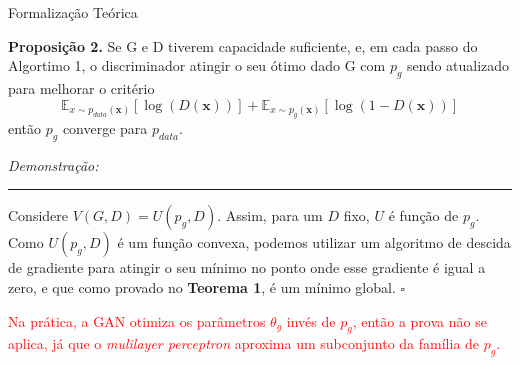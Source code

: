 \documentclass[10pt]{beamer}
\newcommand*{\QEDB}{\hfill\ensuremath{\square}}%
\begin{document}
	




\begin{frame}[fragile]{Formalização Teórica}
	
	\small
	\textbf{Proposição 2.} Se G e D tiverem capacidade suficiente,
	e, em cada passo do Algortimo 1, o discriminador atingir o seu
	ótimo dado G com $p_g$ sendo atualizado para melhorar o critério
    $$
    \mathbb{E}_{x\sim p_{data}(\bm x)}\left[\log{(D(\bm x))}\right]+
    \mathbb{E}_{x\sim p_g(\bm x)}\left[\log(1-D(\bm x) )\right]
    $$
    então $p_g$ converge para $p_{data}$.

	\textit{Demonstração:}
	\hrule
	Considere $V(G,D) = U(p_g,D)$. Assim, para um $D$ fixo, $U$ é
	função de $p_g$.
	Como $U(p_g,D)$ é um função convexa, podemos utilizar um algoritmo
	de descida de gradiente para atingir o seu mínimo no ponto
	onde esse gradiente é igual a zero, e que como provado
	no \textbf{Teorema 1}, é um mínimo global.
	\QEDB
	\pause

	\textcolor{red}{Na prática, a GAN otimiza os parâmetros
	$\theta_g$ invés de $p_g$, então a prova não se aplica,
	já que o \textit{mulilayer perceptron} aproxima um subconjunto
	da família de $p_g$.}

\end{frame}
\end{document}
